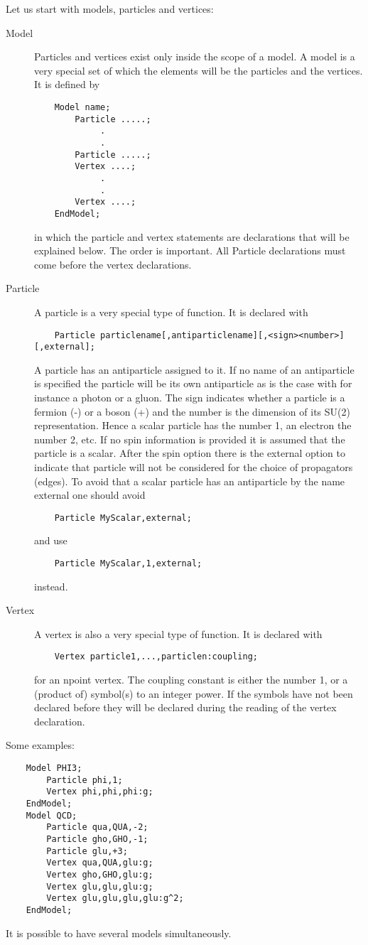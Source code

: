 Let us start with models, particles and vertices:
\begin{description}
\item[Model] Particles and vertices exist only inside the scope of a model. 
A model is a very special set of which the elements will be the particles 
and the vertices. It is defined by
\begin{verbatim}
    Model name;
        Particle .....;
             .
             .
        Particle .....;
        Vertex ....;
             .
             .
        Vertex ....;
    EndModel;
\end{verbatim}
in which the particle and vertex statements are declarations that will be 
explained below. The order is important. All Particle declarations must 
come before the vertex declarations.
\item[Particle] A particle is a very special type of function. It is 
declared with
\begin{verbatim}
    Particle particlename[,antiparticlename][,<sign><number>][,external];
\end{verbatim}
A particle has an antiparticle assigned to it. If no name of an 
antiparticle is specified the particle will be its own antiparticle as is 
the case with for instance a photon or a gluon. The sign indicates whether 
a particle is a fermion (-) or a boson (+) and the number is the dimension 
of its SU(2) representation. Hence a scalar particle has the number 1, an 
electron the number 2, etc. If no spin information is provided it is 
assumed that the particle is a scalar. After the spin option there is the 
external option to indicate that particle will not be considered for the 
choice of propagators (edges). To avoid that a scalar particle has an 
antiparticle by the name external one should avoid
\begin{verbatim}
    Particle MyScalar,external;
\end{verbatim}
and use
\begin{verbatim}
    Particle MyScalar,1,external;
\end{verbatim}
instead.
\item[Vertex] A vertex is also a very special type of function. It is 
declared with
\begin{verbatim}
    Vertex particle1,...,particlen:coupling;
\end{verbatim}
for an npoint vertex. The coupling constant is either the number 1, or a 
(product of) symbol(s) to an integer power. If the symbols have not been 
declared before they will be declared during the reading of the vertex 
declaration.
\end{description}
Some examples:
\begin{verbatim}
    Model PHI3;
        Particle phi,1;
        Vertex phi,phi,phi:g;
    EndModel;
    Model QCD;
        Particle qua,QUA,-2;
        Particle gho,GHO,-1;
        Particle glu,+3;
        Vertex qua,QUA,glu:g;
        Vertex gho,GHO,glu:g;
        Vertex glu,glu,glu:g;
        Vertex glu,glu,glu,glu:g^2;
    EndModel;
\end{verbatim}
It is possible to have several models simultaneously.

